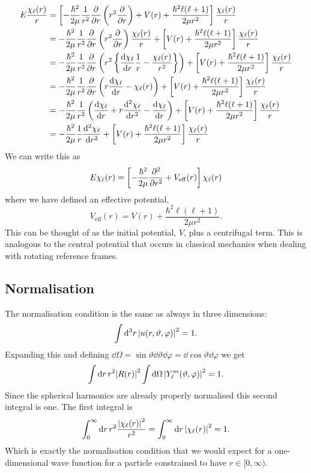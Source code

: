 \documentclass[a4paper]{article}
\newcommand{\eff}{{\mathrm{eff}}}
\theoremstyle{definition}
\begin{document}
    \begin{align*}
        E\frac{\chi_\ell(r)}{r} &= \left[-\frac{\hbar^2}{2\mu} \frac{1}{r^2} \pdv{r} \left(r^2\pdv{r}\right) + V(r) + \frac{\hbar^2\ell(\ell + 1)}{2\mu r^2}\right]\frac{\chi_\ell(r)}{r}\\
        &= -\frac{\hbar^2}{2\mu}\frac{1}{r^2}\pdv{r} \left(r^2 \pdv{r}\right) \frac{\chi_\ell(r)}{r} + \left[V(r) + \frac{\hbar^2\ell(\ell + 1)}{2\mu r^2}\right] \frac{\chi_\ell(r)}{r}\\
        &= -\frac{\hbar^2}{2\mu}\frac{1}{r^2}\pdv{r} \left(r^2 \left\{\dv{\chi_\ell}{r}\frac{1}{r} - \frac{\chi_\ell(r)}{r^2}\right\}\right) + \left[V(r) + \frac{\hbar^2\ell(\ell + 1)}{2\mu r^2}\right] \frac{\chi_\ell(r)}{r}\\
        &= -\frac{\hbar^2}{2\mu}\frac{1}{r^2}\pdv{r} \left(r\dv{\chi_\ell}{r} - \chi_\ell(r)\right) + \left[V(r) + \frac{\hbar^2\ell(\ell + 1)}{2\mu r^2}\right] \frac{\chi_\ell(r)}{r}\\
        &= -\frac{\hbar^2}{2\mu}\frac{1}{r^2}\left(\dv{\chi_\ell}{r} + r\dv[2]{\chi_\ell}{r} - \dv{\chi_\ell}{r}\right) + \left[V(r) + \frac{\hbar^2\ell(\ell + 1)}{2\mu r^2}\right] \frac{\chi_\ell(r)}{r}\\
        &= -\frac{\hbar^2}{2\mu}\frac{1}{r}\dv[2]{\chi_\ell}{r} + \left[V(r) + \frac{\hbar^2\ell(\ell + 1)}{2\mu r^2}\right] \frac{\chi_\ell(r)}{r}\\
    \end{align*}
    We can write this as
    \begin{equation}\label{eqn:central potential radial SE}
        E\chi_\ell(r) = \left[-\frac{\hbar^2}{2\mu}\pdv[2]{r} + V_\eff(r)\right]\chi_\ell(r)
    \end{equation}
    where we have defined an effective potential,
    \[V_{\eff}(r) = V(r) + \frac{\hbar^2\ell(\ell + 1)}{2\mu r^2}.\]
    This can be thought of as the initial potential, \(V\), plus a centrifugal term.
    This is analogous to the central potential that occurs in classical mechanics when dealing with rotating reference frames.
    
    \subsection{Normalisation}
    The normalisation condition is the same as always in three dimensions:
    \[\int\dd[3]{r} \abs{u(r, \vartheta, \varphi)}^2 = 1.\]
    Expanding this and defining \(\dd{\Omega} = \sin\vartheta\dd{\vartheta}\dd{\varphi} = \dd{\cos\vartheta}\dd{\varphi}\) we get
    \[\int\dd{r}r^2\abs{R(r)}^2\int \dd{\Omega}\abs{Y_\ell^m(\vartheta, \varphi)}^2 = 1.\]
    Since the spherical harmonics are already properly normalised this second integral is one.
    The first integral is
    \[\int_0^{\infty}\dd{r}r^2\frac{\abs{\chi_\ell(r)}^2}{r^2} = \int_0^\infty\dd{r}\abs{\chi_\ell(r)}^2 = 1.\]
    Which is exactly the normalisation condition that we would expect for a one-dimensional wave function for a particle constrained to have \(r\in[0, \infty)\).
    
\end{document}
